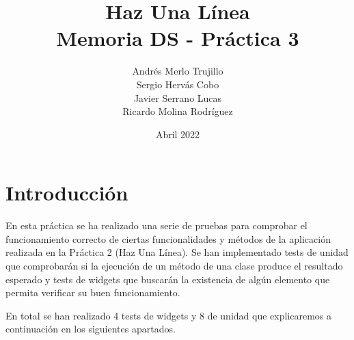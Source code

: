 \documentclass{article}
\title{Haz Una Línea\\
\large Memoria DS - Práctica 3}
\author{Andrés Merlo Trujillo\\ Sergio Hervás Cobo\\ Javier Serrano Lucas\\ Ricardo Molina Rodríguez}
\begin{document}
\date{Abril 2022}
\maketitle
\section{Introducción}
En esta práctica se ha realizado una serie de pruebas para comprobar el funcionamiento correcto de
ciertas funcionalidades y métodos de la aplicación realizada en la Práctica 2 (Haz Una Línea). Se han implementado
tests de unidad que comprobarán si la ejecución de un método de una clase produce el resultado
esperado y tests de widgets que buscarán la existencia de algún elemento que permita verificar su buen funcionamiento.

En total se han realizado 4 tests de widgets y 8 de unidad que explicaremos a continuación en los siguientes apartados.
\end{document}
